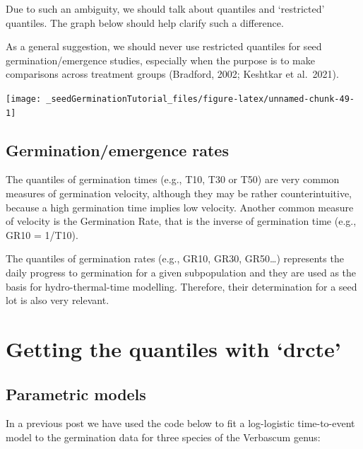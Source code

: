 \documentclass[
]{book}
\begin{document}
Due to such an ambiguity, we should talk about quantiles and `restricted' quantiles. The graph below should help clarify such a difference.

As a general suggestion, we should never use restricted quantiles for seed germination/emergence studies, especially when the purpose is to make comparisons across treatment groups (Bradford, 2002; Keshtkar et al.~2021).

\texttt{[image: \_seedGerminationTutorial\_files/figure-latex/unnamed-chunk-49-1]}

\hypertarget{germinationemergence-rates}{%
\subsection{Germination/emergence rates}\label{germinationemergence-rates}}

The quantiles of germination times (e.g., T10, T30 or T50) are very common measures of germination velocity, although they may be rather counterintuitive, because a high germination time implies low velocity. Another common measure of velocity is the Germination Rate, that is the inverse of germination time (e.g., GR10 = 1/T10).

The quantiles of germination rates (e.g., GR10, GR30, GR50\ldots) represents the daily progress to germination for a given subpopulation and they are used as the basis for hydro-thermal-time modelling. Therefore, their determination for a seed lot is also very relevant.

\hypertarget{getting-the-quantiles-with-drcte}{%
\section{Getting the quantiles with `drcte'}\label{getting-the-quantiles-with-drcte}}

\hypertarget{parametric-models}{%
\subsection{Parametric models}\label{parametric-models}}

In a previous post we have used the code below to fit a log-logistic time-to-event model to the germination data for three species of the Verbascum genus:
\end{document}
